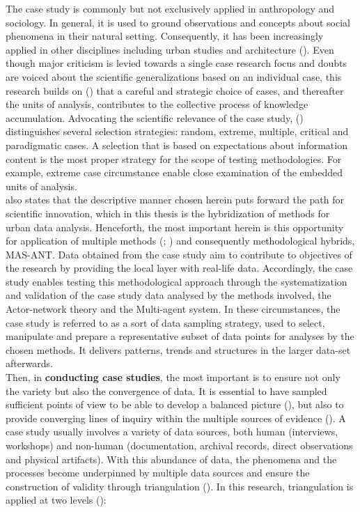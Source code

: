 \documentclass[11pt]{report}
\begin{document}
The case study is commonly but not exclusively applied in anthropology and sociology.
In general, it is used to ground observations and concepts about social phenomena in their natural setting. Consequently, it has been increasingly applied in other disciplines including urban studies and architecture (\href{Feagin}{\citealt{feagin_case_1991}}). Even though major criticism is levied towards a single case research focus and doubts are voiced about the scientific generalizations based on an individual case, this research builds on (\href{Flyvbjerg}{\citealt{flyvbjerg_five_2006}}) that a careful and strategic choice of cases, and thereafter the units of analysis, contributes to the collective process of knowledge accumulation.
Advocating the scientific relevance of the case study, (\href{Flvybjerg}{\citealt{flyvbjerg_five_2006}}) distinguishes several selection strategies: random, extreme, multiple, critical and paradigmatic cases. A selection that is based on expectations about information content is the most proper strategy for the scope of testing methodologies. For example, extreme case circumstance enable close examination of the embedded units of analysis.
\\

\href{Flvybjerg}{\cite{flyvbjerg_five_2006}} also states that the descriptive manner chosen herein puts forward the path for scientific innovation, which in this thesis is the hybridization of methods for urban data analysis. Henceforth, the most important herein is this opportunity for application of multiple methods (\href{Yin}{\citealt{yin_case_2003}}; \href{Yin} {\citealt{yin_case_2009}}) and consequently methodological hybrids, MAS-ANT.
Data obtained from the case study aim to contribute to objectives of the research by providing the local layer with real-life data. Accordingly, the case study enables testing this methodological approach through the systematization and validation of the case study data analysed by the methods involved, the Actor-network theory and the Multi-agent system. In these circumstances, the case study is referred to as a sort of data sampling strategy, used to select, manipulate and prepare a representative subset of data points for analyses by the chosen methods. It delivers patterns, trends and structures in the larger data-set afterwards.
\\

Then, in \textbf{conducting case studies}, the most important is to ensure not only the variety but also the convergence of data. It is essential to have sampled  sufficient  points  of  view  to be able to develop a balanced picture (\href{Harrison}{\citealt{partington_case_2002}}), but also to provide converging lines of inquiry within the multiple sources of evidence (\href{Yin} {\citealt{yin_case_2009}}).
A case study usually involves a variety of data sources, both human (interviews, workshops) and non-human (documentation, archival records, direct observations and physical artifacts).
With this abundance of data, the phenomena and the processes become underpinned by multiple data sources and ensure the construction of validity through triangulation (\href{Denzin}{\citealt{denzin_research_2009}}). In this research, triangulation is applied at two levels (\href{Patton}{\citealt{patton_qualitative_2001}}):
\end{document}
